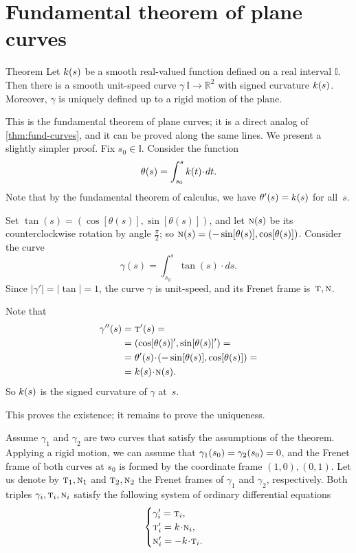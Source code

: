 \section{Fundamental theorem of plane curves}

\begin{thm}{Theorem}\label{thm:fund-curves-2D}
Let $k(s)$ be a smooth real-valued function defined on a real interval $\mathbb{I}$.
Then there is a smooth unit-speed curve $\gamma\:\mathbb{I}\to\mathbb{R}^2$ with signed curvature $k(s)$.
Moreover, $\gamma$ is uniquely defined up to a rigid motion of the plane.
\end{thm}

This is the fundamental theorem of plane curves; it is a direct analog of \ref{thm:fund-curves}, and it can be proved along the same lines.
We present a slightly simpler proof.
Fix $s_0\in\mathbb{I}$.
Consider the function
\[\theta(s)
=
\int_{s_0}^s\skur(t)\cdot dt.\]
Note that by the fundamental theorem of calculus, we have $\theta'(s)\z=\skur(s)$ for all~$s$.

Set 
$\tan(s)=(\cos[\theta(s)],\sin[\theta(s)])$,
and let $\text{\sc{n}}(s)$ be its counterclockwise rotation by angle $\tfrac\pi2$; so 
$\text{\sc{n}}(s)=(-\sin[\theta(s)],\cos[\theta(s)])$.
Consider the curve 
\[\gamma(s)=\int_{s_0}^s\tan(s)\cdot ds.\]
Since $|\gamma'|=|\tan|=1$, the curve $\gamma$ is unit-speed, and its Frenet frame is~$\text{\sc{t}},\text{\sc{n}}$. 

Note that
\begin{align*}
\gamma''(s)&=\tan'(s)=
\\
&=(\cos[\theta(s)]',\sin[\theta(s)]')=
\\
&=\theta'(s)\cdot (-\sin[\theta(s)],\cos[\theta(s)])=
\\
&=\skur(s)\cdot \norm(s).
\end{align*}
So $k(s)$ is the signed curvature of $\gamma$ at~$s$. 

This proves the existence;
it remains to prove the uniqueness.

Assume $\gamma_1$ and $\gamma_2$ are two curves that satisfy the assumptions of the theorem.
Applying a rigid motion, we can assume that $\gamma_1(s_0)\z=\gamma_2(s_0)\z=0$, and the Frenet frame of both curves at $s_0$ is formed by the coordinate frame $(1,0),(0,1)$.
Let us denote by $\text{\sc{t}}_1,\text{\sc{n}}_1$ and $\text{\sc{t}}_2,\text{\sc{n}}_2$ the Frenet frames of $\gamma_1$ and $\gamma_2$, respectively.
Both triples $\gamma_i,\text{\sc{t}}_i,\text{\sc{n}}_i$ satisfy the following system of ordinary differential equations 
\[
\begin{cases}
\gamma_i'=\tan_i,
\\
\tan_i'=\skur\cdot\norm_i,
\\
\norm_i'=-\skur\cdot\tan_i.
\end{cases}
\]

